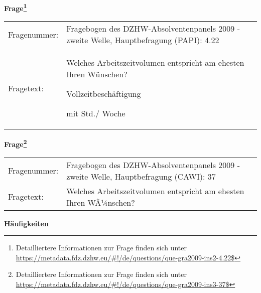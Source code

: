 				\vspace*{0.5cm}
                \noindent\textbf{Frage\footnote{Detailliertere Informationen zur Frage finden sich unter
		              \url{https://metadata.fdz.dzhw.eu/\#!/de/questions/que-gra2009-ins2-4.22$}}}\\
				\begin{tabularx}{\hsize}{@{}lX}
					Fragenummer: &
					  Fragebogen des DZHW-Absolventenpanels 2009 - zweite Welle, Hauptbefragung (PAPI):
					  4.22
 \\
					Fragetext: & Welches Arbeitszeitvolumen entspricht am ehesten Ihren Wünschen?\par  Vollzeitbeschäftigung\par  mit Std./ Woche \\
				\end{tabularx}
				\vspace*{0.5cm}
                \noindent\textbf{Frage\footnote{Detailliertere Informationen zur Frage finden sich unter
		              \url{https://metadata.fdz.dzhw.eu/\#!/de/questions/que-gra2009-ins3-37$}}}\\
				\begin{tabularx}{\hsize}{@{}lX}
					Fragenummer: &
					  Fragebogen des DZHW-Absolventenpanels 2009 - zweite Welle, Hauptbefragung (CAWI):
					  37
 \\
					Fragetext: & Welches Arbeitszeitvolumen entspricht am ehesten Ihren WÃ¼nschen? \\
				\end{tabularx}





        		\vspace*{0.5cm}
                \noindent\textbf{Häufigkeiten}


